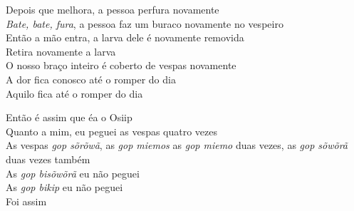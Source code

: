  \smallskip
 \begin{center}\end{center}
 \smallskip
 
\noindent  Depois que melhora, a pessoa perfura novamente\\
 \textit{Bate, bate, fura}, a pessoa faz um buraco novamente no vespeiro\\
 Então a mão entra, a larva dele é novamente removida\\
 Retira novamente a larva\\
 O nosso braço inteiro é coberto de vespas novamente\\
 A dor fica conosco até o romper do dia\\
 Aquilo fica até o romper do dia
 
 \smallskip
 \begin{center}\end{center}
 \smallskip
 
\noindent  Então é assim que éa o Osiip\\
 Quanto a mim, eu peguei as vespas quatro vezes\\
 As vespas \textit{gop sõrõwã}, as \textit{gop miemos} as \textit{gop miemo} duas vezes, as \textit{gop sõwõrã} duas vezes também\\
 As \textit{gop bisõwõrã} eu não peguei\\
 As \textit{gop bikip} eu não peguei\\
 Foi assim
 
